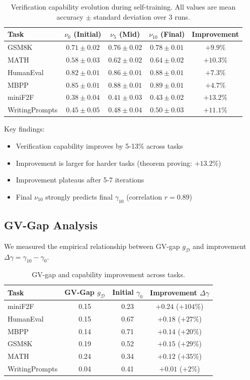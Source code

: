 \documentclass{article}
\theoremstyle{definition}
\theoremstyle{remark}
\newcommand{\D}{\mathcal{D}}
\begin{document}
\begin{table}[h]
\centering
\caption{Verification capability evolution during self-training. All values are mean accuracy \(\pm\) standard deviation over 3 runs.}
\label{tab:verification-evolution}
\begin{tabular}{lcccc}
\toprule
Task & \(\nu_0\) (Initial) & \(\nu_5\) (Mid) & \(\nu_{10}\) (Final) & Improvement \\
\midrule
GSM8K & \(0.71 \pm 0.02\) & \(0.76 \pm 0.02\) & \(0.78 \pm 0.01\) & \(+9.9\%\) \\
MATH & \(0.58 \pm 0.03\) & \(0.62 \pm 0.02\) & \(0.64 \pm 0.02\) & \(+10.3\%\) \\
HumanEval & \(0.82 \pm 0.01\) & \(0.86 \pm 0.01\) & \(0.88 \pm 0.01\) & \(+7.3\%\) \\
MBPP & \(0.85 \pm 0.01\) & \(0.88 \pm 0.01\) & \(0.89 \pm 0.01\) & \(+4.7\%\) \\
miniF2F & \(0.38 \pm 0.04\) & \(0.41 \pm 0.03\) & \(0.43 \pm 0.02\) & \(+13.2\%\) \\
WritingPrompts & \(0.45 \pm 0.05\) & \(0.48 \pm 0.04\) & \(0.50 \pm 0.03\) & \(+11.1\%\) \\
\bottomrule
\end{tabular}
\end{table}

Key findings:
\begin{itemize}
\item Verification capability improves by 5-13\% across tasks
\item Improvement is larger for harder tasks (theorem proving: \(+13.2\%\))
\item Improvement plateaus after 5-7 iterations
\item Final \(\nu_{10}\) strongly predicts final \(\gamma_{10}\) (correlation \(r = 0.89\))
\end{itemize}

\subsection{GV-Gap Analysis}

We measured the empirical relationship between GV-gap \(g_\D\) and improvement \(\Delta\gamma = \gamma_{10} - \gamma_0\).

\begin{table}[h]
\centering
\caption{GV-gap and capability improvement across tasks.}
\label{tab:gap-improvement}
\begin{tabular}{lccc}
\toprule
Task & GV-Gap \(g_\D\) & Initial \(\gamma_0\) & Improvement \(\Delta\gamma\) \\
\midrule
miniF2F & 0.15 & 0.23 & \(+0.24\) (\(+104\%\)) \\
HumanEval & 0.15 & 0.67 & \(+0.18\) (\(+27\%\)) \\
MBPP & 0.14 & 0.71 & \(+0.14\) (\(+20\%\)) \\
GSM8K & 0.19 & 0.52 & \(+0.15\) (\(+29\%\)) \\
MATH & 0.24 & 0.34 & \(+0.12\) (\(+35\%\)) \\
WritingPrompts & 0.04 & 0.41 & \(+0.01\) (\(+2\%\)) \\
\bottomrule
\end{tabular}
\end{table}
\end{document}
